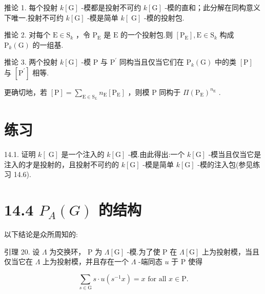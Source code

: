 \documentclass[10pt]{article}
\begin{document}
推论 1. 每个投射 \(k\left\lbrack  \mathrm{G}\right\rbrack\) -模都是投射不可约 \(k\left\lbrack  \mathrm{G}\right\rbrack\) -模的直和；此分解在同构意义下唯一.投射不可约 \(k\left\lbrack  \mathrm{G}\right\rbrack\) -模是简单 \(k\left\lbrack  \mathrm{\;G}\right\rbrack\) -模的投射包.

推论 2. 对每个 \(\mathrm{E} \in  {\mathrm{S}}_{k}\) ，令 \({\mathrm{P}}_{\mathrm{E}}\) 是 \(\mathrm{E}\) 的一个投射包.则 \(\left\lbrack  {\mathrm{P}}_{\mathrm{E}}\right\rbrack  ,\mathrm{E} \in  {\mathrm{S}}_{k}\) 构成 \({\mathrm{P}}_{k}\left( \mathrm{G}\right)\) 的一组基.

推论 3. 两个投射 \(k\left\lbrack  \mathrm{G}\right\rbrack\) -模 \(\mathrm{P}\) 与 \({\mathrm{P}}^{\prime }\) 同构当且仅当它们在 \({\mathrm{P}}_{k}\left( \mathrm{G}\right)\) 中的类 \(\left\lbrack  \mathrm{P}\right\rbrack\) 与 \(\left\lbrack  {\mathrm{P}}^{\prime }\right\rbrack\) 相等.

更确切地，若 \(\left\lbrack  \mathrm{P}\right\rbrack   = \mathop{\sum }\limits_{{\mathrm{E} \in  {\mathrm{S}}_{L}}}{n}_{\mathrm{E}}\left\lbrack  {\mathrm{P}}_{\mathrm{E}}\right\rbrack\) ，则模 \(\mathrm{P}\) 同构于 \(\Pi {\left( {\mathrm{P}}_{\mathrm{E}}\right) }^{{n}_{\mathrm{E}}}\) .

\section*{练习}

14.1. 证明 \(k\left\lbrack  \mathrm{\;G}\right\rbrack\) 是一个注入的 \(k\left\lbrack  \mathrm{G}\right\rbrack\) -模.由此得出:一个 \(k\left\lbrack  \mathrm{G}\right\rbrack\) -模当且仅当它是注入的才是投射的，且投射不可约的 \(k\left\lbrack  \mathrm{G}\right\rbrack\) -模是简单 \(k\left\lbrack  \mathrm{G}\right\rbrack\) -模的注入包(参见练习 14.6).

\section*{14.4 \({P}_{A}\left( G\right)\) 的结构}

以下结论是众所周知的:

引理 20. 设 \(\Lambda\) 为交换环， \(\mathrm{P}\) 为 \(\Lambda \left\lbrack  \mathrm{G}\right\rbrack\) -模.为了使 P 在 \(\Lambda \left\lbrack  \mathrm{G}\right\rbrack\) 上为投射模，当且仅当它在 \(\Lambda\) 上为投射模，并且存在一个 \(\Lambda\) -端同态 \(u\) 于 \(\mathrm{P}\) 使得

\[
\mathop{\sum }\limits_{{s \in  \mathrm{G}}}s \cdot  u\left( {{s}^{-1}x}\right)  = x\text{ for all }x \in  \mathrm{P}.
\]
\end{document}
